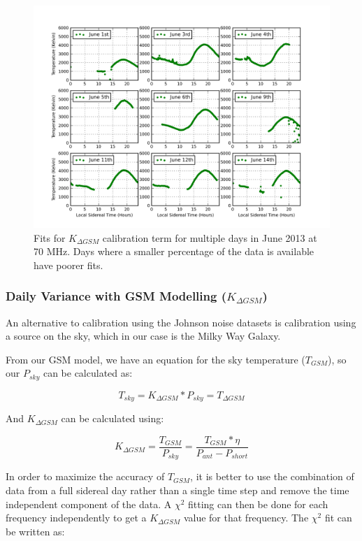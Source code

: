 \begin{figure}[htb]
\begin{center}
\includegraphics[width=0.95\linewidth]{Data_analysis/figures/Combined_Kdgsm_time_series.png}
\caption{Fits for $K_{\Delta GSM}$ calibration term for multiple days in June 2013 at 70 MHz. Days where a smaller percentage of the data is available have poorer fits. }
\label{Fig:Kdgsm_var}
\end{center}
\end{figure}

\subsubsection{Daily Variance with GSM Modelling ($K_{\Delta GSM}$)}\label{Sec:KGSM}

An alternative to calibration using the Johnson noise datasets is calibration using a source on the sky, which in our case is the Milky Way Galaxy. 

From our GSM model, we have an equation for the sky temperature ($T_{GSM}$), so our $P_{sky}$ can be calculated as:

\begin{equation}
T_{sky} = K_{\Delta GSM}*P_{sky} = T_{\Delta GSM}
\end{equation}

And $K_{\Delta GSM}$ can be calculated using:

\begin{equation}
K_{\Delta GSM} = \frac{T_{GSM}}{P_{sky}} = \frac{T_{GSM}* \eta}{P_{ant}-P_{short}}
\end{equation}

In order to maximize the accuracy of $T_{GSM}$, it is better to use the combination of data from a full sidereal day rather than a single time step and remove the time independent component of the data. A $\chi^2$ fitting can then be done  for each frequency independently to get a $K_{\Delta GSM}$ value for that frequency. The $\chi^2$ fit can be written as:

